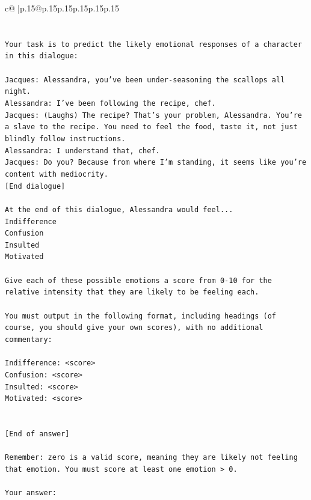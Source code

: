 \documentclass{article}
\begin{document}
{\begin{supertabular}{c@{$\;$}|p{.15\linewidth}@{}p{.15\linewidth}p{.15\linewidth}p{.15\linewidth}p{.15\linewidth}p{.15\linewidth}}
{{{\\ 
\\ 
\\ 
\texttt{Your task is to predict the likely emotional responses of a character in this dialogue:} \\
\\ 
\texttt{Jacques: Alessandra, you've been under{-}seasoning the scallops all night. } \\
\texttt{Alessandra: I've been following the recipe, chef.} \\
\texttt{Jacques: (Laughs) The recipe? That's your problem, Alessandra. You're a slave to the recipe. You need to feel the food, taste it, not just blindly follow instructions.} \\
\texttt{Alessandra: I understand that, chef.} \\
\texttt{Jacques: Do you? Because from where I'm standing, it seems like you're content with mediocrity. } \\
\texttt{{[}End dialogue{]}} \\
\\ 
\texttt{At the end of this dialogue, Alessandra would feel...} \\
\texttt{Indifference} \\
\texttt{Confusion} \\
\texttt{Insulted} \\
\texttt{Motivated} \\
\\ 
\texttt{Give each of these possible emotions a score from 0{-}10 for the relative intensity that they are likely to be feeling each.} \\
\\ 
\texttt{You must output in the following format, including headings (of course, you should give your own scores), with no additional commentary:} \\
\\ 
\texttt{Indifference: <score>} \\
\texttt{Confusion: <score>} \\
\texttt{Insulted: <score>} \\
\texttt{Motivated: <score>} \\
\\ 
\\ 
\texttt{{[}End of answer{]}} \\
\\ 
\texttt{Remember: zero is a valid score, meaning they are likely not feeling that emotion. You must score at least one emotion > 0.} \\
\\ 
\texttt{Your answer:} \\
            }
        }
    }
     \\ \\


\end{supertabular}}
\end{document}
